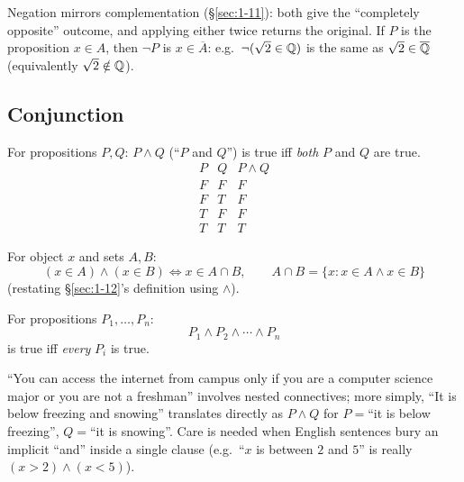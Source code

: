 \begin{note}
Negation mirrors complementation (\S\ref{sec:1-11}): both give the ``completely opposite'' outcome, and applying either twice returns the original. If $P$ is the proposition $x \in A$, then $\neg P$ is $x \in \overline{A}$: e.g.\ $\neg(\sqrt2 \in \mathbb{Q})$ is the same as $\sqrt2 \in \overline{\mathbb{Q}}$ (equivalently $\sqrt2 \notin \mathbb{Q}$).
\end{note}

\subsection{Conjunction}
\label{sec:4-6}

\begin{definition}[Conjunction]
For propositions $P,Q$: $P \wedge Q$ (``$P$ and $Q$'') is true iff \emph{both} $P$ and $Q$ are true.
\[
\begin{array}{cc|c}
P & Q & P \wedge Q \\ \hline
F & F & F \\
F & T & F \\
T & F & F \\
T & T & T
\end{array}
\]
\end{definition}

\begin{note}
For object $x$ and sets $A,B$:
\[
(x \in A) \wedge (x \in B) \iff x \in A \cap B, \qquad A \cap B = \{x : x\in A \wedge x \in B\}
\]
(restating \S\ref{sec:1-12}'s definition using $\wedge$).
\end{note}

\begin{definition}
For propositions $P_1,\dots,P_n$:
\[
P_1 \wedge P_2 \wedge \cdots \wedge P_n
\]
is true iff \emph{every} $P_i$ is true.
\end{definition}

\begin{example}
``You can access the internet from campus only if you are a computer science major or you are not a freshman'' involves nested connectives; more simply, ``It is below freezing and snowing'' translates directly as $P \wedge Q$ for $P=$``it is below freezing'', $Q=$``it is snowing''. Care is needed when English sentences bury an implicit ``and'' inside a single clause (e.g.\ ``$x$ is between $2$ and $5$'' is really $(x>2)\wedge(x<5)$).
\end{example}

